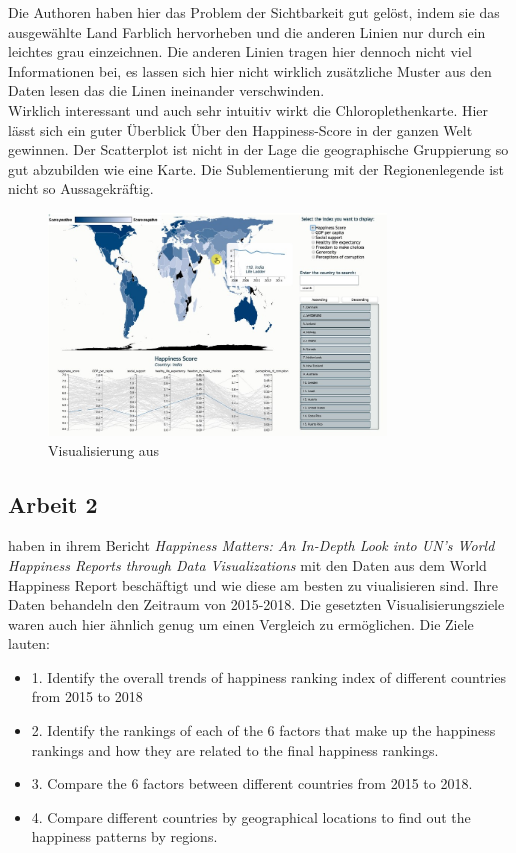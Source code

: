 Die Authoren haben hier das Problem der Sichtbarkeit gut gelöst, indem sie das ausgewählte Land Farblich hervorheben und die anderen Linien nur durch ein leichtes grau einzeichnen. Die anderen Linien tragen hier dennoch nicht viel Informationen bei, es lassen sich hier nicht wirklich zusätzliche Muster aus den Daten lesen das die Linen ineinander verschwinden.\\

Wirklich interessant und auch sehr intuitiv wirkt die Chloroplethenkarte. Hier lässt sich ein guter Überblick Über den Happiness-Score in der ganzen Welt gewinnen. Der Scatterplot ist nicht in der Lage die geographische Gruppierung so gut abzubilden wie eine Karte. Die Sublementierung mit der Regionenlegende ist nicht so Aussagekräftig. 

\cite{bazurto2019}
\begin{figure}[h]
 \centering
 \includegraphics[width = 0.8\textwidth]{img/bazurto_vis.jpg}
 \caption{Visualisierung aus \textcite{bazurto2019}}
 \label{fig:bazurto}
\end{figure}

\subsection{Arbeit 2}

\textcite{happiness_2018} haben in ihrem Bericht \textit{Happiness Matters: An In-Depth Look into UN’s World Happiness Reports through Data Visualizations} mit den Daten aus dem World Happiness Report beschäftigt und wie diese am besten zu viualisieren sind. Ihre Daten behandeln den Zeitraum von 2015-2018. Die gesetzten Visualisierungsziele waren auch hier ähnlich genug um einen Vergleich zu ermöglichen. Die Ziele lauten: \\

\begin{itemize}
    \item 1. Identify the overall trends of happiness ranking index of different countries from 2015 to 2018
    \item 2. Identify the rankings of each of the 6 factors that make up the happiness rankings and how they are related to the final happiness rankings.
    \item 3. Compare the 6 factors between different countries from 2015 to 2018.
    \item 4. Compare different countries by geographical locations to find out the happiness patterns by regions.
\end{itemize}

